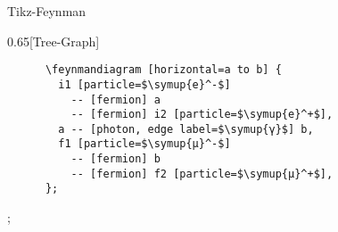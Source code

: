 \begin{frame}[fragile]{Tikz-Feynman}
  \begin{CodeExample}{0.65}[Tree-Graph]
    \begin{verbatim}
      \feynmandiagram [horizontal=a to b] {
        i1 [particle=$\symup{e}^-$]
          -- [fermion] a
          -- [fermion] i2 [particle=$\symup{e}^+$],
        a -- [photon, edge label=$\symup{γ}$] b,
        f1 [particle=$\symup{μ}^-$]
          -- [fermion] b
          -- [fermion] f2 [particle=$\symup{μ}^+$],
      };
    \end{verbatim}
  \CodeResult
    ;
  \end{CodeExample}
\end{frame}
